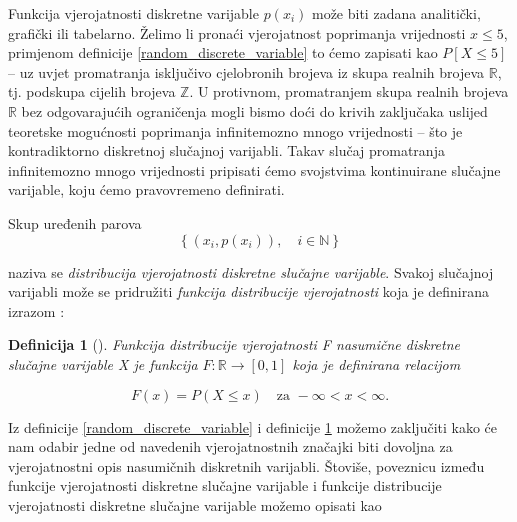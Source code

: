 \documentclass[a4paper,12pt,oneside]{memoir}
\newtheorem{definition}{Definicija}[chapter]
\begin{document}
                Funkcija vjerojatnosti diskretne varijable $p(x_i)$ može biti zadana analitički, grafički ili tabelarno. Želimo li pronaći vjerojatnost poprimanja vrijednosti $x\leq5$, primjenom definicije \ref{random_discrete_variable} to ćemo zapisati kao $P[X\leq 5]$ -- uz uvjet promatranja isključivo cjelobronih brojeva iz skupa realnih brojeva $\mathbb{R}$, tj. podskupa cijelih brojeva $\mathbb{Z}$. U protivnom, promatranjem skupa realnih brojeva $\mathbb{R}$ bez odgovarajućih ograničenja mogli bismo doći do krivih zaključaka uslijed teoretske mogućnosti poprimanja infinitemozno mnogo vrijednosti -- što je kontradiktorno diskretnoj slučajnoj varijabli. Takav slučaj promatranja infinitemozno mnogo vrijednosti pripisati ćemo svojstvima kontinuirane slučajne varijable, koju ćemo pravovremeno definirati.

                Skup uređenih parova
                \begin{equation}
                    \left\{\left(x_i,p(x_i)\right), \quad i\in\mathbb{N}\right\}
                \end{equation}
                
                naziva se \textit{distribucija vjerojatnosti diskretne slučajne varijable}. Svakoj slučajnoj varijabli može se pridružiti \textit{funkcija distribucije vjerojatnosti} koja je definirana izrazom \cite{Bahovec}:

                \begin{definition}[\cite{Dekking}]
                    Funkcija distribucije vjerojatnosti F nasumične diskretne slučajne varijable X je funkcija $F:\mathbb{R}\to\left[0,1\right]$ koja je definirana relacijom

                    \begin{equation*}
                        F(x)=P(X\leq x)     \quad   \text{za } -\infty<x<\infty.
                    \end{equation*}
                    \label{random_discrete_distribution_function}
                \end{definition}

                Iz definicije \ref{random_discrete_variable} i definicije \ref{random_discrete_distribution_function} možemo zaključiti kako će nam odabir jedne od navedenih vjerojatnostnih značajki biti dovoljna za vjerojatnostni opis nasumičnih diskretnih varijabli. Štoviše, poveznicu između funkcije vjerojatnosti diskretne slučajne varijable i funkcije distribucije vjerojatnosti diskretne slučajne varijable možemo opisati kao
\end{document}

